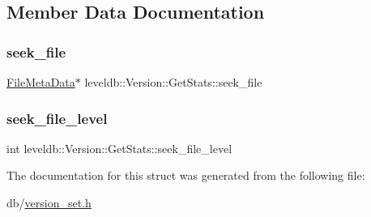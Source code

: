 \subsection{Member Data Documentation}
\mbox{\label{structleveldb_1_1_version_1_1_get_stats_a8c677e9a2d5bc48a5bcc40e07dd2cca7}} 
\subsubsection{\texorpdfstring{seek\_file}{seek\_file}}
{\footnotesize\ttfamily \mbox{\hyperlink{structleveldb_1_1_file_meta_data}{File\+Meta\+Data}}$\ast$ leveldb\+::\+Version\+::\+Get\+Stats\+::seek\+\_\+file}

\mbox{\label{structleveldb_1_1_version_1_1_get_stats_a6cd952d5850faf00c7d45f79973a76d4}} 
\subsubsection{\texorpdfstring{seek\_file\_level}{seek\_file\_level}}
{\footnotesize\ttfamily int leveldb\+::\+Version\+::\+Get\+Stats\+::seek\+\_\+file\+\_\+level}



The documentation for this struct was generated from the following file\+:\begin{DoxyCompactItemize}
\item 
db/\mbox{\hyperlink{version__set_8h}{version\+\_\+set.\+h}}\end{DoxyCompactItemize}
